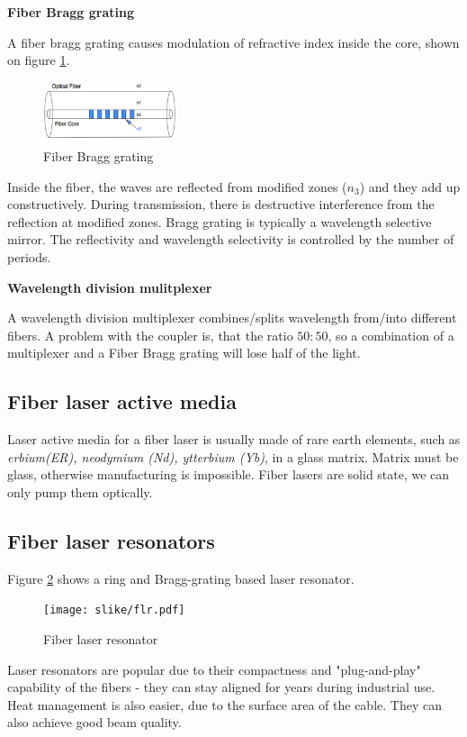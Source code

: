 \textbf{Fiber Bragg grating}

A fiber bragg grating causes modulation of refractive index inside the core, shown on figure \ref{fig:fbg}.
\begin{figure}[h!]
    \centering
    \includegraphics[width=0.35\textwidth]{slike/fbg.png}
    \caption{Fiber Bragg grating}
    \label{fig:fbg}
\end{figure}

Inside the fiber, the waves are reflected from modified zones ($n_3$) and they add up constructively.
During transmission, there is destructive interference from the reflection at modified zones. Bragg grating 
is typically a wavelength selective mirror. The reflectivity and wavelength selectivity is controlled by the number of periods.

\textbf{Wavelength division mulitplexer}

A wavelength division multiplexer combines/splits wavelength from/into different fibers. 
A problem with the coupler is, that the ratio $50:50$, so a combination of a multiplexer and a Fiber Bragg 
grating will lose half of the light.  

\subsection{Fiber laser active media}

Laser active media for a fiber laser is usually made of rare earth elements, 
such as \textit{erbium(ER), neodymium (Nd), ytterbium (Yb)}, in a glass matrix.
Matrix must be glass, otherwise manufacturing is impossible. 
Fiber lasers are solid state, we can only pump them optically. 

\subsection{Fiber laser resonators}
Figure \ref{fig:flr} shows a ring and Bragg-grating based laser resonator.
\begin{figure}[h!]
    \centering
    \texttt{[image: slike/flr.pdf]}
    \caption{Fiber laser resonator}
    \label{fig:flr}
\end{figure}


Laser resonators are popular due to their compactness and "plug-and-play" capability
of the fibers - they can stay aligned 
for years during industrial use. Heat management is also easier, due 
to the surface area of the cable. They can also achieve good beam quality.

